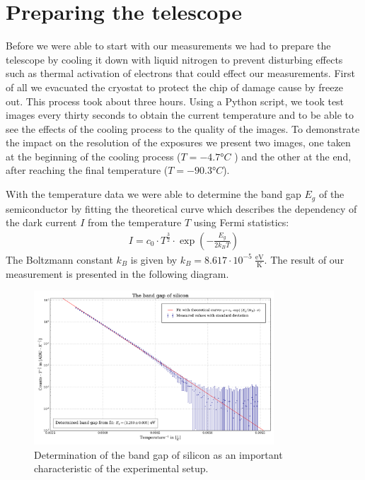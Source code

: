 \chapter{Preparing the telescope}
Before we were able to start with our measurements we had to prepare the telescope by cooling it down with liquid nitrogen to prevent disturbing effects such as thermal activation of electrons that could effect our measurements. First of all we evacuated the cryostat to protect the chip of damage cause by freeze out. This process took about three hours. Using a Python script, we took test images every thirty seconds to obtain the current temperature and to be able to see the effects of the cooling process to the quality of the images. To demonstrate the impact on the resolution of the exposures we present two images, one taken at the beginning of the cooling process ($T = -4.7 °C$ ) and the other at the end, after reaching the final temperature ($T = -90.3 °C$).


With  the temperature data we were able to determine the band gap $E_g$ of the semiconductor by fitting the theoretical curve which describes the dependency of the dark current $I$ from the temperature $T$ using Fermi statistics:
\begin{align}
	I = c_0 \cdot T^{\frac{3}{2}}\cdot\exp(-\frac{E_g}{2 k_B T})
\end{align}
The Boltzmann constant $k_B$ is given by $k_B = 8.617 \cdot 10^{-5} \ \frac{\text{eV}}{\text{K}}$.
The result of our measurement is presented in the following diagram.
\begin{figure}[H]
\centering
\includegraphics[width=0.8\textwidth]{figures/Plots /band_gap.pdf}
\caption{Determination of the band gap of silicon as an important characteristic of the experimental setup.}	
\end{figure}
